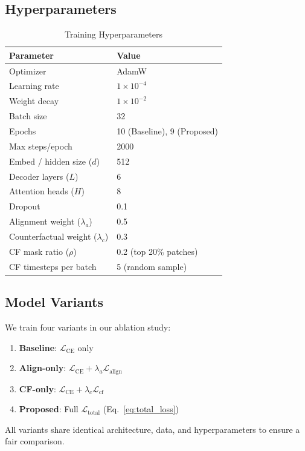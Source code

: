 \documentclass[conference]{IEEEtran}
\begin{document}
\subsection{Hyperparameters}

\begin{table}[htbp]
\caption{Training Hyperparameters}
\begin{center}
\begin{tabular}{ll}
\toprule
\textbf{Parameter} & \textbf{Value} \\
\midrule
Optimizer & AdamW \\
Learning rate & $1 \times 10^{-4}$ \\
Weight decay & $1 \times 10^{-2}$ \\
Batch size & 32 \\
Epochs & 10 (Baseline), 9 (Proposed) \\
Max steps/epoch & 2000 \\
Embed / hidden size ($d$) & 512 \\
Decoder layers ($L$) & 6 \\
Attention heads ($H$) & 8 \\
Dropout & 0.1 \\
Alignment weight ($\lambda_a$) & 0.5 \\
Counterfactual weight ($\lambda_c$) & 0.3 \\
CF mask ratio ($\rho$) & 0.2 (top 20\% patches) \\
CF timesteps per batch & 5 (random sample) \\
\bottomrule
\end{tabular}
\label{tab:hyperparams}
\end{center}
\end{table}

\subsection{Model Variants}

We train four variants in our ablation study:
\begin{enumerate}
    \item \textbf{Baseline}: $\mathcal{L}_{\text{CE}}$ only
    \item \textbf{Align-only}: $\mathcal{L}_{\text{CE}} + \lambda_a \mathcal{L}_{\text{align}}$
    \item \textbf{CF-only}: $\mathcal{L}_{\text{CE}} + \lambda_c \mathcal{L}_{\text{cf}}$
    \item \textbf{Proposed}: Full $\mathcal{L}_{\text{total}}$ (Eq.~\eqref{eq:total_loss})
\end{enumerate}
All variants share identical architecture, data, and hyperparameters to ensure a fair comparison.
\end{document}
